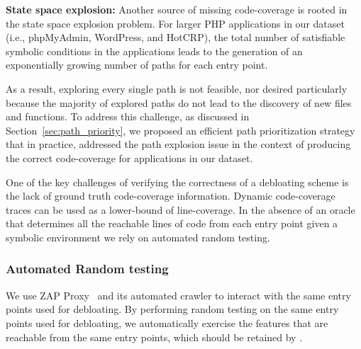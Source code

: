 {\noindent \textbf{State space explosion:} 
Another source of missing code-coverage is rooted in the state space explosion problem. 
For larger PHP applications in our dataset (i.e., phpMyAdmin, WordPress, and HotCRP), the total number of satisfiable symbolic conditions in the applications leads to the generation of an exponentially growing number of paths for each entry point. 

As a result, exploring every single path is not feasible, nor desired particularly because the majority of explored paths do not lead to the discovery of new files and functions.  
To address this challenge, as discussed in Section~\ref{sec:path_priority}, we proposed an efficient path prioritization strategy that in practice, addressed the path explosion issue in the context of producing the correct code-coverage for applications in our dataset. 

One of the key challenges of verifying the correctness of a debloating scheme is the lack of ground truth code-coverage information. 
Dynamic code-coverage traces can be used as a lower-bound of line-coverage. 
In the absence of an oracle that determines all the reachable lines of code from each entry point given a symbolic environment we rely on automated random testing. 

\subsubsection{Automated Random testing}
\label{sec:automated_random_testing}
We use ZAP Proxy~\cite{zapproxy} and its automated crawler to interact with the same entry points used for debloating. 
By performing random testing on the same entry points used for debloating, we automatically exercise the features that are reachable from the same entry points, which should be retained by \animatedead{}. 

}

